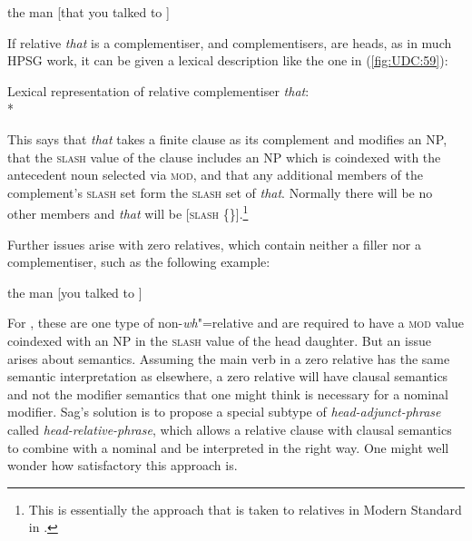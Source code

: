 \documentclass[output=paper
,notxmath 
	        ,collection
	        ,collectionchapter
 	        ,biblatex
                ,babelshorthands
                ,newtxmath
                ,draftmode
                ,colorlinks, citecolor=brown
]{langscibook}
\begin{document}
\begin{exe}
\ex \label{ex:UDC:58}
 the man [that you talked to \trace{}]
\end{exe}

\noindent
If relative \emph{that} is a complementiser, and complementisers, are
heads, as in much HPSG work, it can be given a lexical description
like the one in (\ref{fig:UDC:59}):

\ea
\label{fig:UDC:59}
Lexical representation of relative complementiser \textit{that}:\\*
  
\z

\noindent
This says that \emph{that} takes a finite clause as its complement and
modifies an NP, that the \textsc{slash} value of the clause includes an NP which
is coindexed with the antecedent noun selected via \textsc{mod}, and that any additional members of the
complement's \textsc{slash} set form the \textsc{slash} set of \emph{that}. Normally there
will be no other members and \emph{that} will be [\textsc{slash}
\{\}].\footnote{This is essentially the approach that is taken to
  relatives in Modern Standard  in \citet{Alqurashi:Borsley:12}.}

Further issues arise with zero relatives, which contain neither a filler
nor a complementiser, such as the following  example:

\begin{exe}
\ex \label{ex:UDC:60}
 the man [you talked to \trace{}]
\end{exe}

\noindent
For \citet[Section~6]{Sag:97}, these are one type of non-\emph{wh}"=relative and are
required to have a \textsc{mod} value coindexed with an NP in the \textsc{slash} value of
the head daughter. But an issue arises about semantics. Assuming the
main verb in a zero relative has the same semantic interpretation as
elsewhere, a zero relative will have clausal semantics and not the
modifier semantics that one might think is necessary for a nominal
modifier. Sag's solution is to propose a special subtype of
\emph{head-adjunct-phrase} called \emph{head-relative-phrase}, which
allows a relative clause with clausal semantics to combine with a
nominal and be interpreted in the right way. One might well wonder how
satisfactory this approach is.
\end{document}
